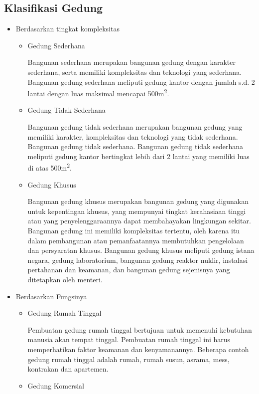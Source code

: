 \subsection{Klasifikasi Gedung}
\begin{itemize}
	\item Berdasarkan tingkat kompleksitas
	\begin{itemize}
		\item Gedung Sederhana
		
		Bangunan sederhana merupakan bangunan gedung dengan karakter sederhana, serta memiliki kompleksitas dan teknologi yang sederhana. Bangunan gedung sederhana meliputi gedung kantor dengan jumlah s.d. 2 lantai dengan luas maksimal mencapai 500m\textsuperscript{2}.
		
		\item Gedung Tidak Sederhana
		
		Bangunan gedung tidak sederhana merupakan bangunan gedung yang memiliki karakter, kompleksitas dan teknologi yang tidak sederhana. Bangunan gedung tidak sederhana. Bangunan gedung tidak sederhana meliputi gedung kantor bertingkat lebih dari 2 lantai yang memiliki luas di atas 500m\textsuperscript{2}.
		
		\item Gedung Khusus
		
		Bangunan gedung khusus merupakan bangunan gedung yang digunakan untuk kepentingan khusus, yang mempunyai tingkat kerahasiaan tinggi atau yang penyelenggaraannya dapat membahayakan lingkungan sekitar. Bangunan gedung ini memiliki kompleksitas tertentu, oleh karena itu dalam pembangunan atau pemanfaatannya membutuhkan pengelolaan dan persyaratan khusus. Bangunan gedung khusus meliputi gedung istana negara, gedung laboratorium, bangunan gedung reaktor nuklir, instalasi pertahanan dan keamanan, dan bangunan gedung sejenisnya yang ditetapkan oleh menteri.
	\end{itemize}
	
	\item Berdasarkan Fungsinya
	\begin{itemize}
		\item Gedung Rumah Tinggal 
		
		Pembuatan gedung rumah tinggal bertujuan untuk memenuhi kebutuhan manusia akan tempat tinggal. Pembuatan rumah tinggal ini harus memperhatikan faktor keamanan dan kenyamanannya. Beberapa contoh gedung rumah tinggal adalah rumah, rumah susun, asrama, mess, kontrakan dan apartemen.
		
		\item Gedung Komersial
		

\end{itemize}
\end{itemize}
